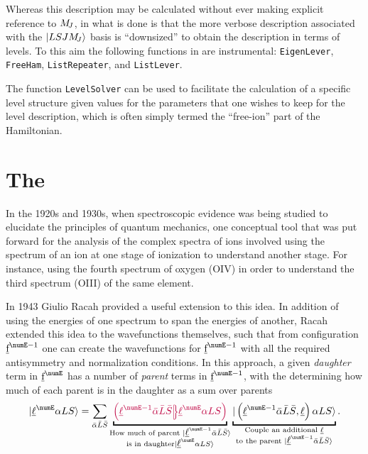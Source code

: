 \documentclass{article}
\newcommand{\codetext}[1]{{\color{BlueViolet} \texttt{#1}}}
\begin{document}
 

Whereas this description may be calculated without ever making explicit reference to $M_{\!{J}}$, in \qlanth what is done is that the more verbose description associated with the $|LSJM_{\!{J}}\rangle$ basis is ``downsized'' to obtain the description in terms of levels. To this aim the following functions in \qlanth are instrumental: \codetext{EigenLever}, \codetext{FreeHam}, \codetext{ListRepeater}, and \codetext{ListLever}.

The function \codetext{LevelSolver} can be used to facilitate the calculation of a specific  level structure given values for the parameters that one wishes to keep for the level description, which is often simply termed the ``free-ion'' part of the Hamiltonian.



\section{The \cfps} 

In the 1920s and 1930s, when spectroscopic evidence was being studied to elucidate the principles of quantum mechanics, one conceptual tool that was put forward for the analysis of the complex spectra of ions \cite{bacher_atomic_1934} involved using the spectrum of an ion at one stage of ionization to understand another stage.  For instance, using the fourth spectrum of oxygen (OIV) in order to understand the third spectrum (OIII) of the same element. 

In 1943 Giulio Racah \cite{racah_theory_1943} provided a useful extension to this idea. In addition of using the energies of one spectrum to span the energies of another, Racah extended this idea to the wavefunctions themselves, such that from configuration $\forb^{\numE-1}$ one can create the wavefunctions for $\forb^{\numE-1}$ with all the required antisymmetry and normalization conditions. In this approach, a given \textit{daughter} term in $\forb^{\numE}$ has a number of \textit{parent} terms in $\forb^{\numE-1}$, with the \cfps determining how much of each parent is in the daughter as a sum over parents
\begin{equation}
\ket{\lorb^\numE \alpha LS} = 
	\sum_{\bar{\alpha}\bar{L}
		\bar{S}} 
		\underbracket{\cfp{\lorb^{\numE-1}\bar{\alpha}\bar{L}\bar{S}}
			{\lorb^{\numE}\alpha{LS}}}_
		{\substack{
            \text{How much of parent }\ket{\lorb^{\numE-1}\bar{\alpha}\bar{L}\bar{S}} \\
            \text{is in daughter}\ket{\lorb^{\numE}{\alpha}{L}{S}}
            }
        }
		\underbracket{\ket{\left(\lorb^{\numE-1}\bar{\alpha}\bar{L}\bar{S},\lorb\right)\alpha{LS}}}_
		{\substack{
            \text{Couple an additional $\lorb$} \\
            \text{to the parent }\ket{\lorb^{\numE-1}\bar{\alpha}\bar{L}\bar{S}}
            }
        }.
\end{equation}
\end{document}
